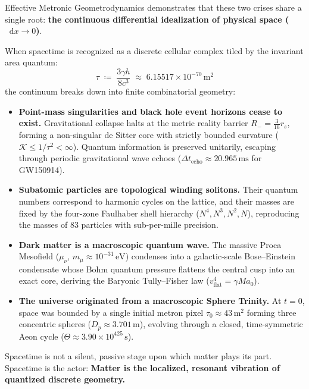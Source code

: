 \documentclass[
    12pt,
    a4paper,
    headings=normal,
    twoside=false,
    open=any,
    parskip=half
]{scrbook}
\newcommand{\diff}{\mathop{}\!\mathrm{d}}
\begin{document}
Effective Metronic Geometrodynamics demonstrates that these two crises share a single root: \textbf{the continuous differential idealization of physical space ($\diff x \to 0$)}.

When spacetime is recognized as a discrete cellular complex tiled by the invariant area quantum:
\begin{equation*}
\tau \;\coloneqq\; \frac{3\gamma h}{8c^3} \;\approx\; 6.15517 \times 10^{-70} \, \text{m}^2
\end{equation*}
the continuum breaks down into finite combinatorial geometry:
\begin{itemize}[leftmargin=1.8em, itemsep=5pt]
    \item \textbf{Point-mass singularities and black hole event horizons cease to exist.} Gravitational collapse halts at the metric reality barrier $R_- = \frac{3}{16}r_s$, forming a non-singular de Sitter core with strictly bounded curvature ($\mathcal{K} \le 1/\tau^2 < \infty$). Quantum information is preserved unitarily, escaping through periodic gravitational wave echoes ($\Delta t_{\text{echo}} \approx 20.965\,\text{ms}$ for GW150914).
    \item \textbf{Subatomic particles are topological winding solitons.} Their quantum numbers correspond to harmonic cycles on the lattice, and their masses are fixed by the four-zone Faulhaber shell hierarchy ($N^4, N^3, N^2, N$), reproducing the masses of 83 particles with sub-per-mille precision.
    \item \textbf{Dark matter is a macroscopic quantum wave.} The massive Proca Mesofield ($\mu_\nu$, $m_\mu \approx 10^{-31}\,\text{eV}$) condenses into a galactic-scale Bose--Einstein condensate whose Bohm quantum pressure flattens the central cusp into an exact core, deriving the Baryonic Tully--Fisher law ($v_{\text{flat}}^4 = \gamma M a_0$).
    \item \textbf{The universe originated from a macroscopic Sphere Trinity.} At $t = 0$, space was bounded by a single initial metron pixel $\tau_0 \approx 43\,\text{m}^2$ forming three concentric spheres ($D_p \approx 3.701\,\text{m}$), evolving through a closed, time-symmetric Aeon cycle ($\Theta \approx 3.90 \times 10^{425}\,\text{s}$).
\end{itemize}

Spacetime is not a silent, passive stage upon which matter plays its part. Spacetime is the actor: \textbf{Matter is the localized, resonant vibration of quantized discrete geometry.}

\vspace{1.5em}
\end{document}
